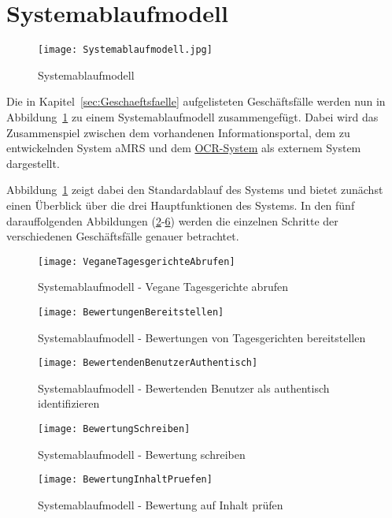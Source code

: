 \section{Systemablaufmodell}\label{sec:Systemablaufmodell}
\begin{figure}
  \centering
  \texttt{[image: Systemablaufmodell.jpg]}
  \caption{Systemablaufmodell}
  \label{fig:Systemablaufmodell}
\end{figure}
Die in Kapitel~\ref{sec:Geschaeftsfaelle} aufgelisteten Geschäftsfälle werden nun in Abbildung~\ref{fig:Systemablaufmodell} zu einem Systemablaufmodell zusammengefügt.
Dabei wird das Zusammenspiel zwischen dem vorhandenen Informationsportal, dem zu entwickelnden System \ac{aMRS} und dem \hyperref[gls:ocr-System]{OCR-System} als externem System dargestellt.

\noindent{}Abbildung~\ref{fig:Systemablaufmodell} zeigt dabei den Standardablauf des Systems und bietet zunächst einen Überblick über die drei Hauptfunktionen des Systems.
In den fünf darauffolgenden Abbildungen (\ref{fig:VeganeTagesgerichteAbrufen}-\ref{fig:BewertungAufInhaltPruefen}) werden die einzelnen Schritte der verschiedenen Geschäftsfälle genauer betrachtet.

\begin{figure}
  \centering
  \texttt{[image: VeganeTagesgerichteAbrufen]}
  \caption{Systemablaufmodell - Vegane Tagesgerichte abrufen}
  \label{fig:VeganeTagesgerichteAbrufen}
\end{figure}
\begin{figure}
  \centering
  \texttt{[image: BewertungenBereitstellen]}
  \caption{Systemablaufmodell - Bewertungen von Tagesgerichten bereitstellen}
  \label{fig:BewertungenVonTagesgerichtenBereitstellen}
\end{figure}
\begin{figure}
  \centering
  \texttt{[image: BewertendenBenutzerAuthentisch]}
  \caption{Systemablaufmodell - Bewertenden Benutzer als authentisch identifizieren}
  \label{fig:BewertendenBenutzerAlsAuthentischIdentifizieren}
\end{figure}
\begin{figure}
  \centering
  \texttt{[image: BewertungSchreiben]}
  \caption{Systemablaufmodell - Bewertung schreiben}
  \label{fig:BewertungSchreiben}
\end{figure}
\begin{figure}
  \centering
  \texttt{[image: BewertungInhaltPruefen]}
  \caption{Systemablaufmodell - Bewertung auf Inhalt prüfen}
  \label{fig:BewertungAufInhaltPruefen}
\end{figure}